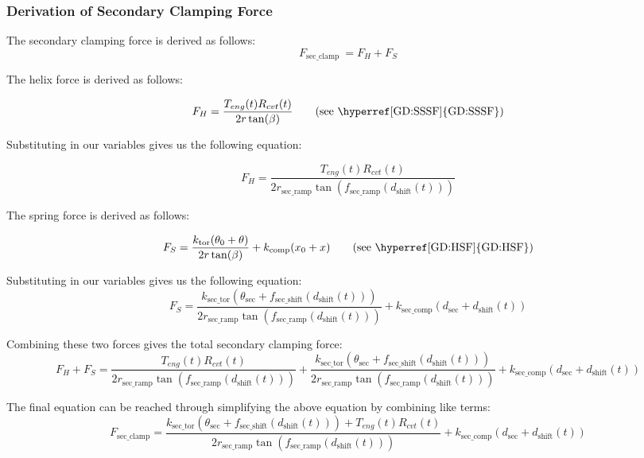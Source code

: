 \documentclass[12pt]{article}
\newcommand{\hpref}[1]{\hyperref[#1]{#1}}
\begin{document}
\subsubsection*{Derivation of Secondary Clamping Force}

The secondary clamping force is derived as follows:
\[
F_{\text{sec\_clamp}}\ = F_H + F_S
\]

The helix force is derived as follows:

\[
F_H = \frac{T_{eng}(t) R_{cvt}(t)}{2r\tan(\beta)}  \tag*{\text{(see \hpref{GD:SSSF})}} %
\]

Substituting in our variables gives us the following equation:

\[
F_H = \frac{T_{eng}(t) R_{cvt}(t)}{2 r_{\text{sec\_ramp}} \tan(f_{\text{sec\_ramp}}(d_\text{shift}(t)))}
\]

The spring force is derived as follows:

\[
F_S = \frac{k_{\text{tor}}(\theta_0 + \theta)}{2r\tan(\beta)} + k_\text{comp}(x_0 + x) \tag*{\text{(see \hpref{GD:HSF})}} %
\]

Substituting in our variables gives us the following equation:
\[
F_S = \frac{k_{\text{sec\_tor}} (\theta_{\text{sec}} + f_{\text{sec\_shift}}(d_\text{shift}(t)))}{2 r_{\text{sec\_ramp}} \tan(f_{\text{sec\_ramp}}(d_\text{shift}(t)))} + k_{\text{sec\_comp}} (d_{\text{sec}} + d_\text{shift}(t))
\]

Combining these two forces gives the total secondary clamping force:
\[
F_H + F_S = \frac{T_{eng}(t) R_{cvt}(t)}{2 r_{\text{sec\_ramp}} \tan(f_{\text{sec\_ramp}}(d_\text{shift}(t)))} + \frac{k_{\text{sec\_tor}} (\theta_{\text{sec}} + f_{\text{sec\_shift}}(d_\text{shift}(t)))}{2 r_{\text{sec\_ramp}} \tan(f_{\text{sec\_ramp}}(d_\text{shift}(t)))} + k_{\text{sec\_comp}} (d_{\text{sec}} + d_\text{shift}(t))
\]

The final equation can be reached through simplifying the above equation by combining like terms:
\[
F_{\text{sec\_clamp}} = \frac{k_{\text{sec\_tor}} (\theta_{\text{sec}} + f_{\text{sec\_shift}}(d_\text{shift}(t))) + T_{eng}(t) R_{cvt}(t)}{2 r_{\text{sec\_ramp}} \tan(f_{\text{sec\_ramp}}(d_\text{shift}(t)))} + k_{\text{sec\_comp}} (d_{\text{sec}} + d_\text{shift}(t))
\]
\end{document}
